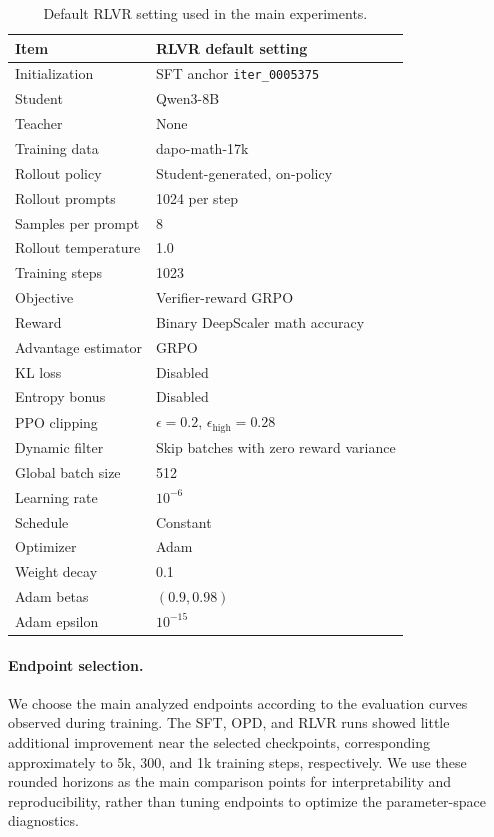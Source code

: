 \documentclass{llmxive}
\providecommand{\arraystretch}{1.05}
\begin{document}
\begin{table}[t]
\centering
\small
\setlength{\tabcolsep}{4pt}
\renewcommand{\arraystretch}{1.08}
\begin{tabularx}{\linewidth}{@{}lX@{}}
\toprule
\textbf{Item} & \textbf{RLVR default setting} \\
\midrule
Initialization & SFT anchor \texttt{iter\_0005375} \\
Student & Qwen3-8B \\
Teacher & None \\
Training data & dapo-math-17k \\
Rollout policy & Student-generated, on-policy \\
Rollout prompts & 1024 per step \\
Samples per prompt & 8 \\
Rollout temperature & 1.0 \\
Training steps & 1023 \\
Objective & Verifier-reward GRPO \\
Reward & Binary DeepScaler math accuracy \\
Advantage estimator & GRPO \\
KL loss & Disabled \\
Entropy bonus & Disabled \\
PPO clipping & $\epsilon=0.2$, $\epsilon_{\mathrm{high}}=0.28$ \\
Dynamic filter & Skip batches with zero reward variance \\
Global batch size & 512 \\
Learning rate & $10^{-6}$ \\
Schedule & Constant \\
Optimizer & Adam \\
Weight decay & 0.1 \\
Adam betas & $(0.9,0.98)$ \\
Adam epsilon & $10^{-15}$ \\
\bottomrule
\end{tabularx}
\caption{Default RLVR setting used in the main experiments.}
\label{tab:rlvr-default-setting}
\end{table}

\paragraph{Endpoint selection.}
We choose the main analyzed endpoints according to the evaluation curves
observed during training. The SFT, OPD, and RLVR runs showed little
additional improvement near the selected checkpoints, corresponding
approximately to 5k, 300, and 1k training steps, respectively. We use these
rounded horizons as the main comparison points for interpretability and
reproducibility, rather than tuning endpoints to optimize the
parameter-space diagnostics.
\end{document}
